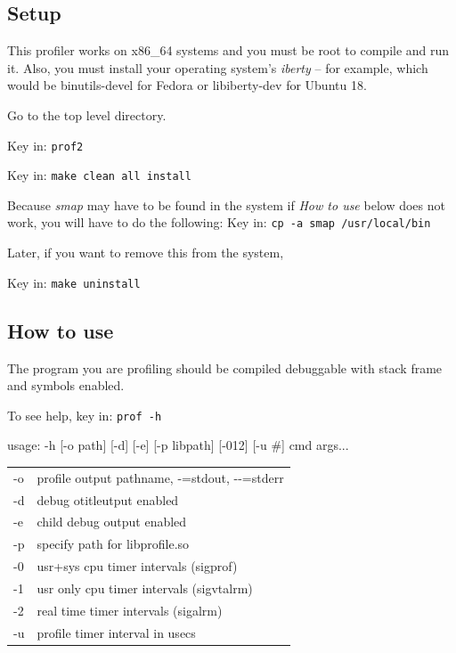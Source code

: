 \subsection{Setup}
\label{sub:setup}

This profiler works on x86\_64 systems and you must be root to compile and run it. Also, you must install your operating system's \textit{iberty} -- for example, which would be binutils-devel for Fedora or libiberty-dev for Ubuntu 18.

Go to the top level \CGG{} directory.

Key in: \qquad \texttt{prof2}

Key in: \qquad \texttt{make clean all install}

Because \textit{smap} may have to be found in the system if \textit{How to use} below does not work, you will have to do the following:
\newline
\newline
Key in: \qquad \texttt{cp -a smap /usr/local/bin}


Later, if you want to remove this from the system,

Key in: \qquad \texttt{make uninstall}

\subsection{How to use}
\label{sub:how_to_use}

The program you are profiling should be compiled debuggable with stack frame and symbols enabled.

To see help, key in: \qquad \texttt{prof -h}

usage: -h [-o path] [-d] [-e] [-p libpath] [-012] [-u \#] cmd args...

\hspace{2em}
\begin{tabular}{@{}ll}
	-o & profile output pathname, -=stdout, -{}-=stderr\\
	-d & debug otitleutput enabled\\
	-e & child debug output enabled\\
	-p & specify path for libprofile.so\\
	-0 & usr+sys cpu timer intervals (sigprof)\\
	-1 & usr only cpu timer intervals (sigvtalrm)\\
	-2 & real time timer intervals (sigalrm)\\
	-u & profile timer interval in usecs\\
\end{tabular}

